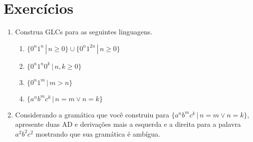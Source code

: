\documentclass[a4paper]{article}
\theoremstyle{definition}
\begin{document}
  \section{Exercícios} 

  \begin{enumerate}
     \item Construa GLCs para as seguintes linguagens.
       \begin{enumerate}
       \item $\{0^n1^n\,|\,n\geq 0\} \cup \{0^n1^{2n}\,|\,n\geq 0\}$
       \item $\{0^n1^n0^k\,|\,n,k \geq 0\}$
       \item $\{0^n1^m\,|\,m > n\}$
       \item $\{a^nb^mc^k\,|\,n = m \lor n = k\}$
       \end{enumerate}
     \item Considerando a gramática que você construiu para $\{a^nb^mc^k\,|\,n =
       m \lor n = k\}$, apresente duas AD e derivações mais a esquerda e a
       direita para a palavra $a^2b^2c^2$ mostrando que sua gramática é ambígua.
  \end{enumerate}
\end{document}
